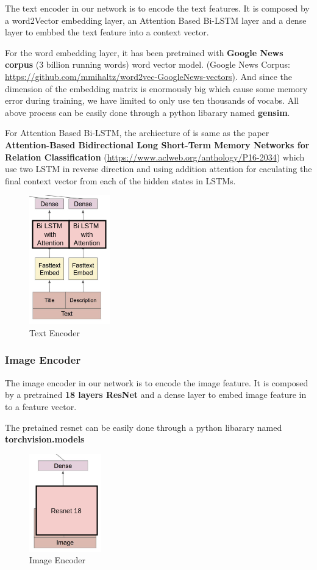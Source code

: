 \documentclass{article}
\begin{document}
The text encoder in our network is to encode the text features. It is composed by a word2Vector  embedding layer, an Attention Based Bi-LSTM layer and a dense layer to embbed the text feature into a context vector.

For the word embedding layer, it has been pretrained with \textbf{Google News corpus} (3 billion running words) word vector model. (Google News Corpus: \url{https://github.com/mmihaltz/word2vec-GoogleNews-vectors)}. And since the dimension of the embedding matrix is enormously big which cause some memory error during training, we have limited to only use ten thousands of vocabs. All above process can be easily done through a python libarary named \textbf{gensim}.

For Attention Based Bi-LSTM, the archiecture of is same as the paper \textbf{Attention-Based Bidirectional Long Short-Term Memory Networks for Relation Classification} (\url{https://www.aclweb.org/anthology/P16-2034}) which use two LSTM in reverse direction and using addition attention for caculating the final context vector from each of the hidden states in LSTMs.

\begin{figure}[h]
  \centering
  \includegraphics[scale=1]{rnn.png}
  \caption{Text Encoder}
\end{figure}

\subsubsection{Image Encoder}

The image encoder in our network is to encode the image feature. It is composed by a pretrained \textbf{18 layers ResNet} and a dense layer to embed image feature in to a feature vector. 

The pretained resnet can be easily done through a python libarary named \textbf{torchvision.models}

\begin{figure}[h]
  \centering
  \includegraphics[scale=1]{cnn.png}
  \caption{Image Encoder}
\end{figure}
\end{document}
